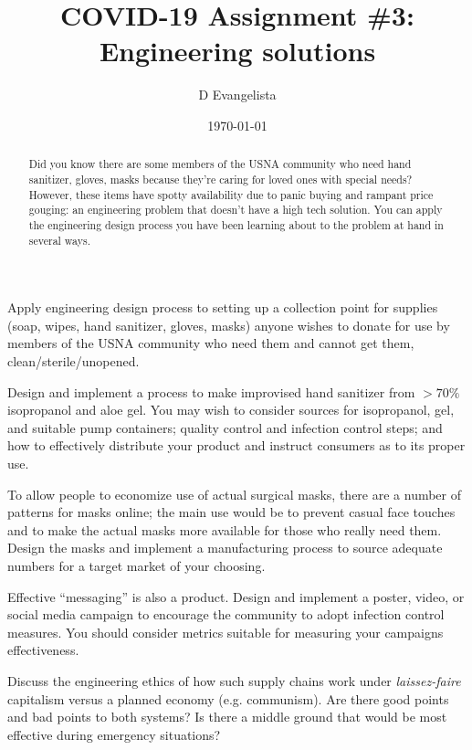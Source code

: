 \documentclass{exam}
\title{COVID-19 Assignment \#3: Engineering solutions}
\author{D Evangelista}
\date{\today}
\begin{document}
\maketitle

\begin{abstract}
Did you know there are some members of the USNA community who need hand sanitizer, gloves, masks because they're caring for loved ones with special needs? However, these items have spotty availability due to panic buying and rampant price gouging: an engineering problem that doesn't have a high tech solution. You can apply the engineering design process you have been learning about to the problem at hand in several ways. 
\end{abstract}

\begin{questions}
\question Apply engineering design process to setting up a collection point for supplies (soap, wipes, hand sanitizer, gloves, masks) anyone wishes to donate for use by members of the USNA community who need them and cannot get them, clean/sterile/unopened. 

\question Design and implement a process to make improvised hand sanitizer from $>70\%$ isopropanol and aloe gel. You may wish to consider sources for isopropanol, gel, and suitable pump containers; quality control and infection control steps; and how to effectively distribute your product and instruct consumers as to its proper use. 

\question To allow people to economize use of actual surgical masks, there are a number of patterns for masks online; the main use would be to prevent casual face touches and to make the actual masks more available for those who really need them. Design the masks and implement a manufacturing process to source adequate numbers for a target market of your choosing. 

\question Effective ``messaging'' is also a product. Design and implement a poster, video, or social media campaign to encourage the community to adopt infection control measures. You should consider metrics suitable for measuring your campaigns effectiveness. 

\question Discuss the engineering ethics of how such supply chains work under \emph{laissez-faire} capitalism versus a planned economy (e.g. communism). Are there good points and bad points to both systems? Is there a middle ground that would be most effective during emergency situations? 
\end{questions}
\end{document}
